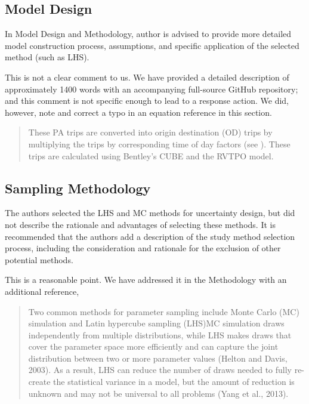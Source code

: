 \documentclass{ar2rc}
\begin{document}
\subsection{Model Design}
\RC In Model Design and Methodology, author is advised to provide more detailed
model construction process, assumptions, and specific application of the
selected method (such as LHS).

\AR This is not a clear comment to us. We have provided a detailed description
of approximately 1400 words with an accompanying full-source GitHub repository;
and this comment is not specific enough to lead to a response action. We did, however, 
note and correct a typo in an equation reference in this section.

\begin{quote}
 These PA trips are converted into origin
destination (OD) trips by multiplying the trips by corresponding time of
day factors (see \DIFdelbegin {}\DIFdelend \DIFaddbegin {}\DIFaddend ). These trips are calculated using Bentley's
CUBE and the RVTPO model.
\end{quote}


\subsection{Sampling Methodology}
\RC The authors selected the LHS and MC methods for uncertainty design, but did
not describe the rationale and advantages of selecting these methods. It is
recommended that the authors add a description of the study method selection
process, including the consideration and rationale for the exclusion of other
potential methods.

\AR This is a reasonable point. We have addressed it in the Methodology with an additional
reference,

\begin{quote}
    Two common methods for parameter sampling include \DIFdelbegin \DIFdel{, }\DIFdelend Monte
Carlo (MC) simulation and Latin hypercube sampling (LHS)\DIFdelbegin {}\DIFdelend \DIFaddbegin {}\DIFaddend MC simulation
draws independently from multiple distributions, while LHS makes draws
that cover the parameter space more efficiently and can capture the
joint distribution between two or more parameter values (Helton and
Davis, 2003). As a result, LHS can reduce the number of draws needed to
fully re-create the statistical variance in a model, but the amount of
reduction is unknown and may not be universal to all problems (Yang et
al., 2013).  \DIFaddbegin {}\DIFaddend 


\DIFaddend 
\end{quote}
\end{document}
